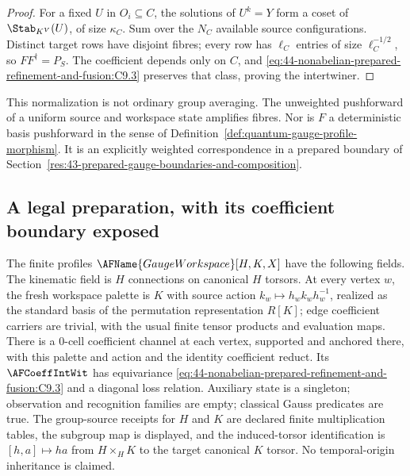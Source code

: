 \begin{proof}
For a fixed $U$ in $O_i\subseteq C$, the solutions of $U^k=Y$ form a coset of
$\Stab_{K^V}(U)$, of size $\kappa_C$.  Sum over the $N_C$ available source
configurations.  Distinct target rows have disjoint fibres; every row has
$\ell_C$ entries of size $\ell_C^{-1/2}$, so $FF^\dagger=P_S$.  The coefficient
depends only on $C$, and
\eqref{eq:44-nonabelian-prepared-refinement-and-fusion:C9.3} preserves that
class, proving the intertwiner.
\end{proof}

This normalization is not ordinary group averaging.  The unweighted
pushforward of a uniform source and workspace state amplifies fibres.  Nor is
$F$ a deterministic basis pushforward in the sense of
Definition~\ref{def:quantum-gauge-profile-morphism}.  It is an explicitly
weighted correspondence in a prepared boundary of
Section~\ref{res:43-prepared-gauge-boundaries-and-composition}.

\subsection{A legal preparation, with its coefficient boundary exposed}\label{md:44-nonabelian-prepared-refinement-and-fusion:a-legal-preparation-with-its-coefficient-boundary-exposed}

\begin{definition}\label{def:gauge-workspace}
The finite profiles $\AFName{GaugeWorkspace}[H,K,X]$ have the following
fields.  The kinematic field is $H$ connections on canonical $H$ torsors.  At
every vertex $w$, the fresh workspace palette is $K$ with source action
$k_w\mapsto h_wk_wh_w^{-1}$, realized as the standard basis of the
permutation representation $R[K]$; edge coefficient carriers are trivial, with
the usual finite tensor products and evaluation maps.  There is a $0$-cell
coefficient channel at each vertex, supported and anchored there, with this
palette and action and the identity coefficient reduct.  Its
$\AFCoeffIntWit$ has equivariance
\eqref{eq:44-nonabelian-prepared-refinement-and-fusion:C9.3} and a diagonal
loss relation.  Auxiliary state is a singleton; observation and recognition
families are empty; classical Gauss predicates are true.  The group-source
receipts for $H$ and $K$ are declared finite multiplication tables, the
subgroup map is displayed, and the induced-torsor identification is
$[h,a]\mapsto ha$ from $H\times_HK$ to the target canonical $K$ torsor.  No
temporal-origin inheritance is claimed.
\end{definition}

